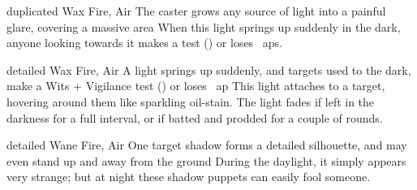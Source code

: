   {duplicated}%
  {Wax}%
  {Fire, Air}%
  {}%
  {The caster grows any source of light into a painful glare, covering a massive area}%
  {When this light springs up suddenly in the dark, anyone looking towards it makes a  test (\tn[9]) or loses ~\glspl{ap}.}

  {detailed}%
  {Wax}%
  {Fire, Air}%
  {}%
  {A light springs up suddenly, and targets used to the dark, make a Wits + Vigilance test (\tn[9]) or loses ~\gls{ap}}%
  {This light attaches to a target, hovering around them like sparkling oil-stain.
    The light fades if left in the darkness for a full \gls{interval}, or if batted and prodded for a couple of rounds.}

  {detailed}%
  {Wane}%
  {Fire, Air}%
  {}%
  {One target shadow forms a detailed silhouette, and may even stand up and away from the ground}%
  {During the daylight, it simply appears very strange; but at night these shadow puppets can easily fool someone.}
